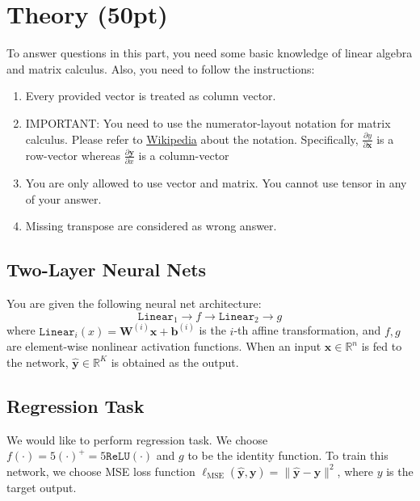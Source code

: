 \documentclass{article}
\newcommand{\R}{\mathbb{R}}	%
\begin{document}
\newpage

\section{Theory (50pt)}

To answer questions in this part, you need some basic knowledge of linear
algebra and matrix calculus. Also, you need to follow the instructions:
\begin{enumerate}
  \item Every provided vector is treated as column vector.
  \item IMPORTANT: You need to use the numerator-layout notation for matrix calculus.
        Please refer to
        \href{https://en.wikipedia.org/wiki/Matrix_calculus#Numerator-layout_notation}{Wikipedia}
        about the notation. Specifically, $\frac{\partial{y}}{\partial{\mathbf{x}}}$ is
        a row-vector whereas $\frac{\partial{\mathbf{y}}}{\partial{x}}$ is a
        column-vector
  \item You are only allowed to use vector and matrix. You cannot use tensor in any of
        your answer.
  \item Missing transpose are considered as wrong answer.
\end{enumerate}

\subsection{Two-Layer Neural Nets}

You are given the following neural net architecture:
%
\[
  \texttt{Linear}_1 \to f \to \texttt{Linear}_2 \to g
\]
%
where $\texttt{Linear}_i (x) = \bm{W}^{(i)}\bm x + \bm b^{(i)}$ is the $i$-th
affine transformation, and $f, g$ are element-wise nonlinear activation
functions. When an input $\bm x \in \R^n$ is fed to the network, $ \bm
  {\hat{y}} \in \R^K$ is obtained as the output.

\subsection{Regression Task}
We would like to perform regression task. We choose $f(\cdot) = 5 (\cdot)^+ = 5
  \texttt{ReLU}(\cdot)$ and $g$ to be the identity function. To train this
network, we choose MSE loss function $\ell_\text{MSE}(\bm{\hat{y}}, \bm{y}) =
  \| \bm{\hat{y}} - \bm{y} \|^2$, where $y$ is the target output.
\end{document}
